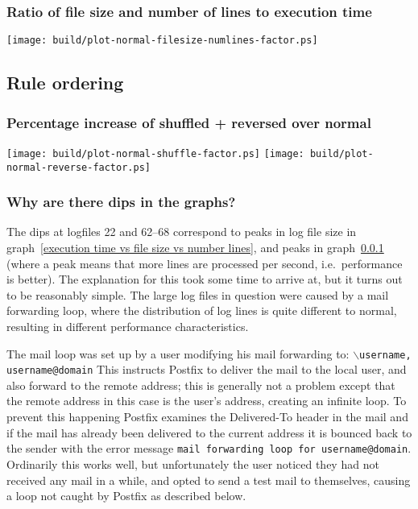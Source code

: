 \documentclass[a4paper,12pt,draft]{article}
\begin{document}
\subsubsection{Ratio of file size and number of lines to execution time}
\label{execution time vs file size vs number lines factor}

\noindent
\texttt{[image: build/plot-normal-filesize-numlines-factor.ps]}




\subsection{Rule ordering}

\label{rule ordering graphs}

\subsubsection{Percentage increase of shuffled + reversed over normal}
\label{normal vs shuffled vs reversed ordering factor}
\texttt{[image: build/plot-normal-shuffle-factor.ps]}
\newline
\texttt{[image: build/plot-normal-reverse-factor.ps]}

\subsubsection{Why are there dips in the graphs?}
\label{Why are there dips in the graphs?}

The dips at logfiles 22 and 62--68 correspond to peaks in log file size in
graph~\ref{execution time vs file size vs number lines}, and peaks in
graph~\ref{execution time vs file size vs number lines factor} (where a
peak means that more lines are processed per second, i.e.\ performance is
better).  The explanation for this took some time to arrive at, but it
turns out to be reasonably simple.  The large log files in question were
caused by a mail forwarding loop, where the distribution of log lines is
quite different to normal, resulting in different performance
characteristics.

The mail loop was set up by a user modifying his mail forwarding to:
\newline \hspace*{2em}\texttt{$\backslash$username, username@domain}
\newline This instructs Postfix to deliver the mail to the local user, and
also forward to the remote address; this is generally not a problem except
that the remote address in this case is the user's address, creating an
infinite loop.  To prevent this happening Postfix examines the Delivered-To
header in the mail and if the mail has already been delivered to the
current address it is bounced back to the sender with the error message
\texttt{mail forwarding loop for username@domain}.  Ordinarily this works
well, but unfortunately the user noticed they had not received any mail in
a while, and opted to send a test mail to themselves, causing a loop not
caught by Postfix as described below.
\end{document}
